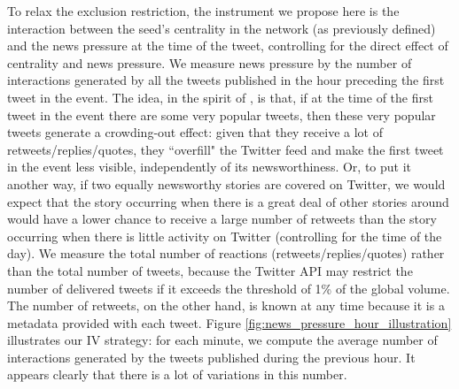 To relax the exclusion restriction, the instrument we propose here is the interaction between the seed's centrality in the network (as previously defined) and the news pressure at the time of the tweet, controlling for the direct effect of centrality and news pressure. We measure news pressure by the number of interactions generated by all the tweets published in the hour preceding the first tweet in the event. The idea, in the spirit of \citet{EisenseeStromberg2007}, is that, if at the time of the first tweet in the event there are some very popular tweets, then these very popular tweets generate a crowding-out effect: given that they receive a lot of retweets/replies/quotes, they ``overfill" the Twitter feed and make the first tweet in the event less visible, independently of its newsworthiness. Or, to put it another way, if two equally newsworthy stories are covered on Twitter, we would expect that the story occurring when there is a great deal of other stories around would have a lower chance to receive a large number of retweets than the story occurring when there is little activity on Twitter (controlling for the time of the day). We measure the total number of reactions (retweets/replies/quotes) rather than the total number of tweets, because the Twitter API may restrict the number of delivered tweets if it exceeds the threshold of 1\% of the global volume. The number of retweets, on the other hand, is known at any time because it is a metadata provided with each tweet. Figure \ref{fig:news_pressure_hour_illustration} illustrates our IV strategy: for each minute, we compute the average number of interactions generated by the tweets published during the previous hour. It appears clearly that there is a lot of variations in this number.


